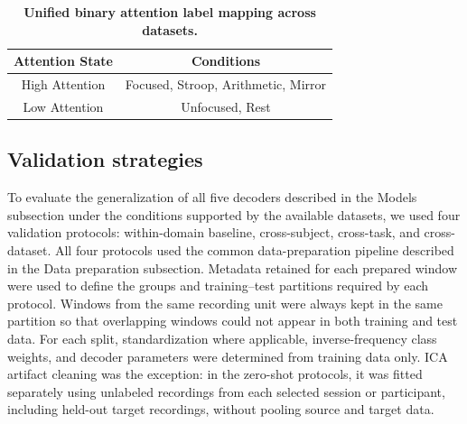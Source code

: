 \documentclass[10pt,letterpaper]{article}
\newcommand{\rev}[1]{#1}
\newcommand{\revs}[1]{#1}
\begin{document}
\begin{table}[!ht]
\centering
\caption{\textbf{Unified binary attention label mapping across datasets.}}
\label{tab:attention_label_mapping}
\begin{tabular}{|c|c|}
\hline
\textbf{Attention State} & \textbf{Conditions} \\
\hline
High Attention & Focused, Stroop, Arithmetic, Mirror \\
Low Attention  & Unfocused, Rest \\
\hline
\end{tabular}
\end{table}
\FloatBarrier

\subsection*{\revs{Validation strategies}}

\rev{To evaluate the generalization of all five decoders described in the Models subsection under the conditions supported by the available datasets, we used four validation protocols: within-domain baseline, cross-subject, cross-task, and cross-dataset. All four protocols used the common data-preparation pipeline described in the Data preparation subsection. Metadata retained for each prepared window were used to define the groups and training--test partitions required by each protocol. Windows from the same recording unit were always kept in the same partition so that overlapping windows could not appear in both training and test data. For each split, standardization where applicable, inverse-frequency class weights, and decoder parameters were determined from training data only. ICA artifact cleaning was the exception: in the zero-shot protocols, it was fitted separately using unlabeled recordings from each selected session or participant, including held-out target recordings, without pooling source and target data.}
\end{document}

